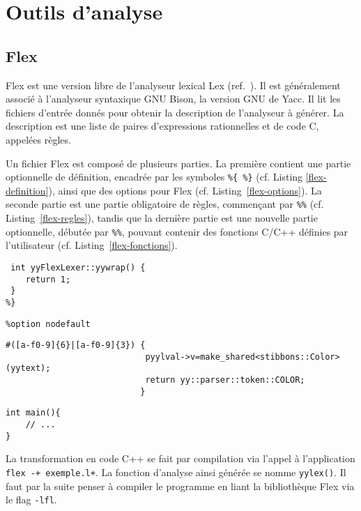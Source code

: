 \section{Outils d'analyse}

\subsection{Flex}
\label{Flex}

Flex est une version libre de l'analyseur lexical Lex (ref.~\cite{flex}). Il est généralement associé à l'analyseur syntaxique GNU Bison, la version GNU de Yacc.
Il lit les fichiers d'entrée donnés pour obtenir la description de l'analyseur à générer. La description est une liste de paires d'expressions rationnelles et de code C, appelées règles.

Un fichier Flex est composé de plusieurs parties. La première contient une partie optionnelle de définition, encadrée par les symboles \verb|%{ %}| (cf. Listing \ref{flex-definition}), ainsi que des options pour Flex (cf. Listing~\ref{flex-options}). La seconde partie est une partie obligatoire de règles, commençant par \verb|%%| (cf. Listing~\ref{flex-regles}), tandis que la dernière partie est une nouvelle partie optionnelle, débutée par \verb|%%|, pouvant contenir des fonctions C/C++ définies par l'utilisateur (cf. Listing~\ref{flex-fonctions}).

\begin{lstlisting}[caption=Partie définition d'un fichier Flex,label=flex-definition]
%{
 int yyFlexLexer::yywrap() {
	return 1;
 }
%}
\end{lstlisting}

\begin{lstlisting}[caption=Options de Flex,label=flex-options]
%option c++
%option nodefault
\end{lstlisting}

\begin{lstlisting}[label=flex-regles,caption=Partie règles de Flex]
%%
#([a-f0-9]{6}|[a-f0-9]{3}) {
							pyylval->v=make_shared<stibbons::Color>(yytext);
							return yy::parser::token::COLOR;
						   }
\end{lstlisting}
\begin{lstlisting}[label=flex-fonctions,caption=Partie fonctions de Flex]
%%
int main(){
	// ...
}
\end{lstlisting}

La transformation en code C++ se fait par compilation via l'appel à l'application \texttt{flex -+ exemple.l+}. La fonction d'analyse ainsi générée se nomme \verb|yylex()|.
Il faut par la suite penser à compiler le programme en liant la bibliothèque Flex via le flag \verb|-lfl|.

